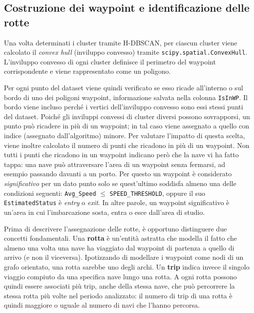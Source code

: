 \subsection{Costruzione dei waypoint e identificazione delle rotte}\label{ssec:meth_routes}
 
Una volta determinati i cluster tramite H-DBSCAN, per ciascun cluster viene calcolato il \emph{convex hull} (inviluppo convesso) 
tramite \texttt{scipy.spatial.ConvexHull}. L'inviluppo convesso di ogni cluster definisce il perimetro del waypoint corrispondente e 
viene rappresentato come un poligono.
 
Per ogni punto del dataset viene quindi verificato se esso ricade all'interno o sul bordo
di uno dei poligoni waypoint, informazione salvata nella colonna \texttt{IsInWP}.
Il bordo viene incluso perché i vertici dell'inviluppo convesso sono essi stessi punti del
dataset.
Poiché gli inviluppi convessi di cluster diversi possono sovrapporsi, un punto può ricadere
in più di un waypoint; in tal caso viene assegnato a quello con indice (assegnato dall'algoritmo) minore.
Per valutare l'impatto di questa scelta, viene inoltre calcolato il numero di punti che
ricadono in più di un waypoint.
Non tutti i punti che ricadono in un waypoint indicano però che la nave vi ha fatto tappa: una nave
può attraversare l'area di un waypoint senza fermarsi, ad esempio passando davanti a un porto.
Per questo un waypoint è considerato \emph{significativo} per un dato punto solo se quest'ultimo
soddisfa almeno una delle condizioni seguenti: \texttt{Avg\_Speed} $\leq$ \texttt{SPEED\_THRESHOLD},
oppure il suo \texttt{EstimatedStatus} è \emph{entry} o \emph{exit}. In altre parole, un waypoint
significativo è un'area in cui l'imbarcazione sosta, entra o esce dall'area di studio.

Prima di descrivere l'assegnazione delle rotte, è opportuno distinguere due concetti
fondamentali. Una \textbf{rotta} è un'entità astratta che modella il fatto che almeno una volta una
nave ha viaggiato dal waypoint di partenza a quello di arrivo (e non il viceversa).
Ipotizzando di modellare i waypoint come nodi di un grafo orientato, una rotta sarebbe uno degli archi.
Un \textbf{trip} indica invece il singolo viaggio compiuto da una specifica nave lungo una rotta.
A ogni rotta possono quindi essere associati più trip, anche della stessa nave, che può percorrere
la stessa rotta più volte nel periodo analizzato: il numero di trip di una rotta è quindi maggiore
o uguale al numero di navi che l'hanno percorsa.

